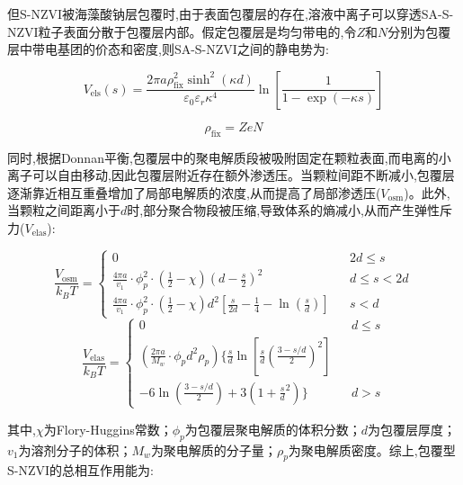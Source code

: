 但S-NZVI被海藻酸钠层包覆时,由于表面包覆层的存在,溶液中离子可以穿透SA-S-NZVI粒子表面分散于包覆层内部。假定包覆层是均匀带电的,令$Z$和$N$分别为包覆层中带电基团的价态和密度,则SA-S-NZVI之间的静电势为:\cite{OHSHIMA20152,vskvarla2020unified,2006390}

\begin{equation}
    V_\mathrm{els}(s)=\frac{2 \pi a \rho_\mathrm{fix}^2 \sinh^2(\kappa d)}{\varepsilon _0 \varepsilon _r\kappa ^4}\ln[\frac{1}{1-\exp(-\kappa s)}]
\end{equation}

\begin{equation}
    \rho_\mathrm{fix}=ZeN
\end{equation}

同时,根据Donnan平衡,包覆层中的聚电解质段被吸附固定在颗粒表面,而电离的小离子可以自由移动,因此包覆层附近存在额外渗透压。当颗粒间距不断减小,包覆层逐渐靠近相互重叠增加了局部电解质的浓度,从而提高了局部渗透压($V_\mathrm{osm}$)\cite{2002Electrosteric}。此外,当颗粒之间距离小于$d$时,部分聚合物段被压缩,导致体系的熵减小,从而产生弹性斥力($V_\mathrm{elas}$)\cite{doi:10.1080/07388551.2018.1440525}:

\begin{equation}
    \frac{V_\mathrm{osm}}{k_BT}=\left\{
        \begin{array}{lcl} %
            0& &{2d\leqslant s}\\
            \frac{4 \pi a }{v_1}\cdot\phi _p^2\cdot(\frac{1}{2}-\chi )(d-\frac{s}{2})^2& &{d\leqslant s <2d}\\
            \frac{4 \pi a }{v_1}\cdot\phi _p^2\cdot(\frac{1}{2}-\chi )d^2[\frac{s}{2d}-\frac{1}{4}-\ln(\frac{s}{d})]& &{s<d}
        \end{array}\right.
\end{equation}
\begin{equation}
    \frac{V_\mathrm{elas}}{k_BT}=\left\{
        \begin{array}{lcl}
            0& &{d\leqslant s}\\
            (\frac{2\pi a}{M_w}\cdot\phi_pd^2\rho_p)\{\frac{s}{d}\ln[\frac{s}{d}(\frac{3-s/d}{2})^2]\\ -6\ln(\frac{3-s/d}{2})+3(1+\frac{s}{d}^2)\}& &{d>s}
        \end{array}\right.
\end{equation}

其中,$\chi$为Flory-Huggins常数；$\phi_p$为包覆层聚电解质的体积分数；$d$为包覆层厚度；$v_1$为溶剂分子的体积；$M_w$为聚电解质的分子量；$\rho_p$为聚电解质密度。综上,包覆型S-NZVI的总相互作用能为:

